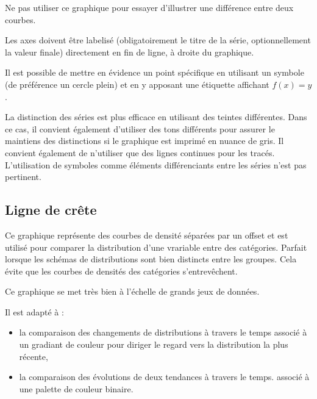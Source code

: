 \documentclass[a4paper,12pt]{article}
\begin{document}
\begin{multicols}{2}
Ne pas utiliser ce graphique pour essayer d'illustrer une différence entre deux courbes. \autocite{jonathanschwabishTime2021}

Les axes doivent être labelisé (obligatoirement le titre de la série, optionnellement la valeur finale) directement en fin de ligne, à droite du graphique. \autocite{andreaskrauseBestPracticesData2024,sosulskiGraphics2019}

Il est possible de mettre en évidence un point spécifique en utilisant un symbole (de préférence un cercle plein) et en y apposant une étiquette affichant \(f(x)=y\).

La distinction des séries est plus efficace en utilisant des teintes différentes. Dans ce cas, il convient également d'utiliser des tons différents pour assurer le maintiens des distinctions si le graphique est imprimé en nuance de gris. \autocite{stephenfewComponentlevelGraphDesign2012}
Il convient également de n'utiliser que des lignes continues pour les tracés. \autocite{stephenfewComponentlevelGraphDesign2012}
L'utilisation de symboles comme éléments différenciants entre les séries n'est pas pertinent. \autocite{stephenfewComponentlevelGraphDesign2012}
\subsection*{Ligne de crête}
\label{sec:orgaa94bba}
Ce graphique représente des courbes de densité séparées par un offset et est utilisé pour comparer la distribution d'une vrariable entre des catégories. \autocite{wilkeVisualizingManyDistributions2019} Parfait lorsque les schémas de distributions sont bien distincts entre les groupes. \autocite{mikeyiHowChooseRight2020} Cela évite que les courbes de densités des catégories s'entrevêchent.\autocite{jonathanschwabishDistribution2021}

Ce graphique se met très bien à l'échelle de grands jeux de données. \autocite{wilkeVisualizingManyDistributions2019}

Il est adapté à :
\begin{itemize}
\item la comparaison des changements de distributions à travers le temps \autocite{wilkeDirectoryVisualizations2019} associé à un gradiant de couleur pour diriger le regard vers la distribution la plus récente, \autocite{jonathanschwabishDistribution2021}
\item la comparaison des évolutions de deux tendances à travers le temps. \autocite{wilkeVisualizingManyDistributions2019} associé à une palette de couleur binaire.
\end{itemize}


\end{multicols}
\end{document}

